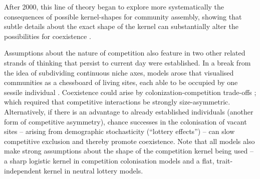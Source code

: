 \documentclass[a4paper,11pt]{article}
\begin{document}
After 2000, this line of theory began to explore more
systematically the consequences of possible kernel-shapes for
community assembly, showing that subtle details about the exact shape of the
kernel can substantially alter the possibilities for coexistence
\citep{Calcagno-2006, Scheffer-2006, Pigolotti-2007,
 Barabas-2012,Barabas-2013,DAndrea-2013,Leimar-2013}.

Assumptions about the nature of competition also feature in two other
related strands of thinking that persist to current day were established. In
a break from the idea of subdividing continuous
niche axes, models arose
that visualised communities as a chessboard of living sites, each able to be
occupied by one sessile individual \citep{Yodzis-1978}. Coexistence could
arise by colonization-competition trade-offs \citep{Levins-1971,
Geritz-1999, Calcagno-2006}; which required that competitive interactions
be strongly size-asymmetric. Alternatively, if there is an advantage to
already established individuals (another form of competitive asymmetry),
chance successes in the colonisation of vacant sites  -- arising from
demographic stochasticity
(``lottery effects'') \citep {Sale-1977, Hubbell-2001} -- can slow
competitive exclusion and thereby promote coexistence.
%
Note that all models also make strong assumptions about the shape of
the competition kernel being used -- a sharp
logistic kernel in competition colonisation models and a
flat, trait-independent kernel in neutral lottery models.
\end{document}
